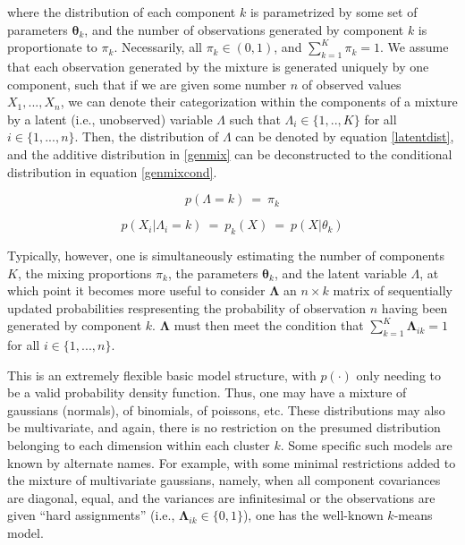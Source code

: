 \documentclass[10pt]{olplainarticle}\usepackage[]{graphicx}\usepackage[]{color}
\begin{document}
where the distribution of each component $k$ is parametrized by some set of parameters $\boldsymbol{\theta}_k$, and the number of observations generated by component $k$ is proportionate to $\pi_k$. Necessarily, all $\pi_k \in (0,1)$, and $\sum_{k=1}^{K}\pi_k = 1$. We assume that each observation generated by the mixture is generated uniquely by one component, such that if we are given some number $n$ of observed values $X_1,...,X_n$, we can denote their categorization within the components of a mixture by a latent (i.e., unobserved) variable $\Lambda$ such that $\Lambda_i \in \{1,..,K\}$ for all $i \in \{1,...,n\}$. Then, the distribution of $\Lambda$ can be denoted by equation \ref{latentdist}, and the additive distribution in \ref{genmix} can be deconstructed to the conditional distribution in equation \ref{genmixcond}.

\begin{equation} \label{latentdist}
  p(\Lambda = k) \ =\ \pi_k
\end{equation}

\begin{equation} \label{genmixcond}
  p(X_i | \Lambda_i = k) \ =\ p_k(X) \ =\ p(X | \theta_k)
\end{equation}


Typically, however, one is simultaneously estimating the number of components $K$, the mixing proportions $\pi_k$, the parameters $\boldsymbol{\theta}_k$, and the latent variable $\Lambda$, at which point it becomes more useful to consider $\boldsymbol{\Lambda}$ an $n \times k$ matrix of sequentially updated probabilities respresenting the probability of observation $n$ having been generated by component $k$. $\boldsymbol{\Lambda}$ must then meet the condition that $\sum_{k=1}^{K}\boldsymbol{\Lambda}_{ik} = 1$ for all $i \in \{1,...,n\}$.

This is an extremely flexible basic model structure, with $p(\cdot)$ only needing to be a valid probability density function. Thus, one may have a mixture of gaussians (normals), of binomials, of poissons, etc. These distributions may also be multivariate, and again, there is no restriction on the presumed distribution belonging to each dimension within each cluster $k$. Some specific such models are known by alternate names. For example, with some minimal restrictions added to the mixture of multivariate gaussians, namely, when all component covariances are diagonal, equal, and the variances are infinitesimal or the observations are given ``hard assignments'' (i.e., $\boldsymbol{\Lambda}_{ik} \in \{0,1\}$), one has the well-known $k$-means model.
\end{document}
